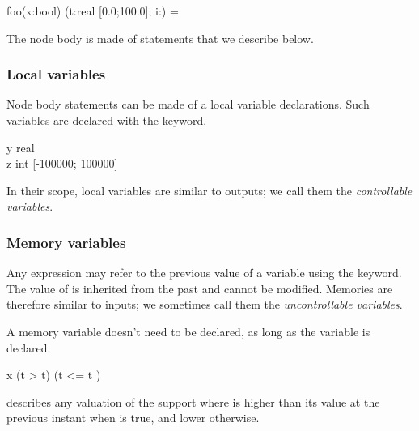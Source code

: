 \begin{example}
\begin{program}
 foo(x:bool)  (t:real [0.0;100.0]; i:) =\\
\end{program}
\end{example}




The node body is made of statements that we describe below.


\subsubsection{Local variables}

Node   body   statements   can   be   made  of   a   local   variable
declarations.  Such  variables  are  declared  with  the  
keyword.

\begin{example}
\begin{program}
  y \key{:} real  \\ 
  z \key{:} int [-100000; 100000]  
\end{program}
\end{example}

In their scope, local variables  are similar to outputs; we call them
the {\em controllable variables}.


\subsubsection{Memory variables}

Any expression  may refer to the  previous value of  a variable using
the   keyword.  The value of  is inherited
from the past and cannot be modified.  Memories are therefore similar
to inputs; we sometimes call them the {\em uncontrollable variables}.


A memory variable   doesn't need to  be declared, as
long as the variable  is declared.



\begin{example}
\begin{program}
 x  (t >  t)  (t <=  t )
\end{program}
describes any valuation  of the support where   is higher than
its value  at the  previous instant when   is true,  and lower
otherwise.
\end{example}

